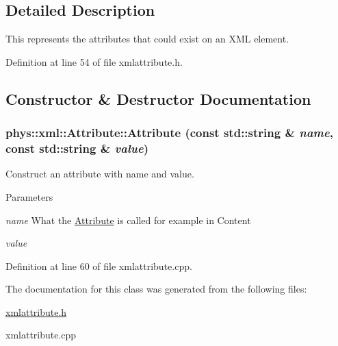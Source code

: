 \subsection{Detailed Description}
This represents the attributes that could exist on an XML element. 

Definition at line 54 of file xmlattribute.h.



\subsection{Constructor \& Destructor Documentation}
\hypertarget{classphys_1_1xml_1_1Attribute_a564df51f8b32ffd1fbd6c69bd278c9a5}{
\subsubsection[{Attribute}]{\setlength{\rightskip}{0pt plus 5cm}phys::xml::Attribute::Attribute (const std::string \& {\em name}, \/  const std::string \& {\em value})}}
\label{da/ddf/classphys_1_1xml_1_1Attribute_a564df51f8b32ffd1fbd6c69bd278c9a5}


Construct an attribute with name and value. 


\begin{DoxyParams}{Parameters}
\item[{\em name}]What the \hyperlink{classphys_1_1xml_1_1Attribute}{Attribute} is called for example in Content \item[{\em value}]\end{DoxyParams}


Definition at line 60 of file xmlattribute.cpp.



The documentation for this class was generated from the following files:\begin{DoxyCompactItemize}
\item 
\hyperlink{xmlattribute_8h}{xmlattribute.h}\item 
xmlattribute.cpp\end{DoxyCompactItemize}
